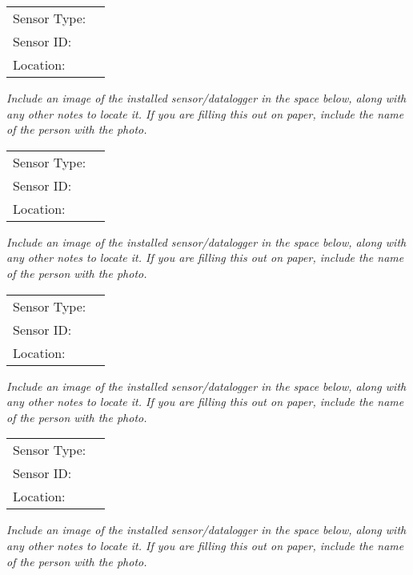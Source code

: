 \documentclass[./main.tex]{subfiles}
\begin{document}
\noindent\begin{tabularx}{\textwidth}{@{}lX@{}}
Sensor Type: & \hrulefill \\[2ex]
Sensor ID: & \hrulefill \\[2ex]
Location: & \hrulefill \\[2ex]
\end{tabularx}

\noindent \emph{Include an image of the installed sensor/datalogger in the space below,  along with any other notes to locate it.  If you are filling this out on paper, include the name of the person with the photo. }

\vspace{8cm}

\noindent\begin{tabularx}{\textwidth}{@{}lX@{}}
Sensor Type: & \hrulefill \\[2ex]
Sensor ID: & \hrulefill \\[2ex]
Location: & \hrulefill \\[2ex]
\end{tabularx}

\noindent \emph{Include an image of the installed sensor/datalogger in the space below,  along with any other notes to locate it.  If you are filling this out on paper, include the name of the person with the photo. }

\vspace{8cm}

\noindent\begin{tabularx}{\textwidth}{@{}lX@{}}
Sensor Type: & \hrulefill \\[2ex]
Sensor ID: & \hrulefill \\[2ex]
Location: & \hrulefill \\[2ex]
\end{tabularx}

\noindent \emph{Include an image of the installed sensor/datalogger in the space below,  along with any other notes to locate it.  If you are filling this out on paper, include the name of the person with the photo. }

\vspace{8cm}

\noindent\begin{tabularx}{\textwidth}{@{}lX@{}}
Sensor Type: & \hrulefill \\[2ex]
Sensor ID: & \hrulefill \\[2ex]
Location: & \hrulefill \\[2ex]
\end{tabularx}

\noindent \emph{Include an image of the installed sensor/datalogger in the space below,  along with any other notes to locate it.  If you are filling this out on paper, include the name of the person with the photo. }

\vspace{8cm}


\end{document}
